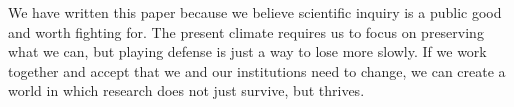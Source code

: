 \documentclass[10pt,letterpaper]{article}
\begin{document}
We have written this paper because we believe scientific inquiry is a public good and worth fighting for.
The present climate requires us to focus on preserving what we can,
but playing defense is just a way to lose more slowly.
If we work together and accept that we and our institutions need to change,
we can create a world in which research does not just survive,
but thrives.


\end{document}
